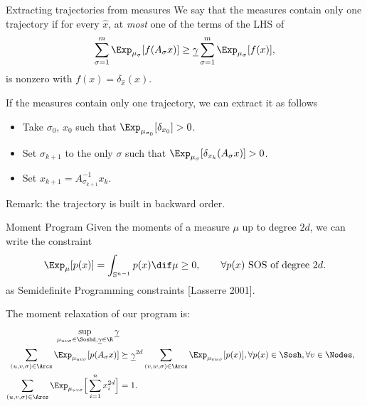 \documentclass{beamer}
\begin{document}
  \begin{frame}{Extracting trajectories from measures}
      We say that the measures contain only one trajectory if for every $\hat{x}$, at \emph{most} one of the terms of the LHS of
      \[ \sum_{\sigma = 1}^m \Exp_{\mu_\sigma}[f(A_\sigma x)] \geq \gamlb \sum_{\sigma = 1}^m \Exp_{\mu_\sigma}[f(x)], \]
      is nonzero with $f(x) = \delta_{\hat{x}}(x)$.

      If the measures contain only one trajectory, we can extract it as follows
      \begin{itemize}
          \item Take $\sigma_0$, $x_0$ such that $\Exp_{\mu_{\sigma_0}}[\delta_{x_0}] > 0$.
          \item Set $\sigma_{k+1}$ to the \alert{only} $\sigma$ such that $\Exp_{\mu_{\sigma}}[\delta_{x_k}(A_\sigma x)] > 0$.
          \item Set $x_{k+1} = A_{\sigma_{k+1}}^{-1}x_k$.
      \end{itemize}
      Remark: the trajectory is built in \alert{backward} order.
  \end{frame}

  \begin{frame}{Moment Program}
      Given the moments of a measure $\mu$ up to degree $2d$,
      we can write the constraint
      \[
          \Exp_{\mu}[p(x)] = \int_{\mathbb{S}^{n-1}} p(x) \dif \mu \geq 0, \qquad \forall p(x) \text{ SOS of degree }2d.
      \]
      as Semidefinite Programming constraints [Lasserre 2001].

      The moment relaxation of our program is:
      \begin{align}
          \notag
          \sup_{\mu_{uv\sigma} \in \Soshd, \gamlb \in \R} \gamlb\\
          \notag
          \sum_{(u,v,\sigma) \in \Arcs} \Exp_{\mu_{uv\sigma}}[p(A_\sigma x)] & \succeq \gamlb^{2d} \sum_{(v,w,\sigma) \in \Arcs} \Exp_{\mu_{vw\sigma}}[p(x)], \forall p(x) \in \Sosh, \forall v \in \Nodes,\\
          \notag
          \sum_{(u,v,\sigma) \in \Arcs} \Exp_{\mu_{uv\sigma}}\Big[\sum_{i=1}^n x_i^{2d}\Big] & = 1.
      \end{align}
  \end{frame}
\end{document}
